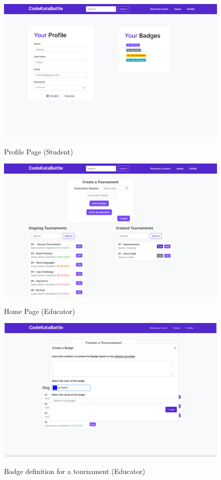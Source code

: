 \documentclass{Configuration_Files/Template}
\begin{document}
\begin{figure}[H]
\centering
\includegraphics[scale = 0.25]{Images/UI/Profile_Student.png}\\
\caption{Profile Page (Student) }
\end{figure}

\begin{figure}[H]
\centering
\includegraphics[scale = 0.25]{Images/UI/MainPageEducator.png}\\
\caption{Home Page (Educator)}
\end{figure}

\begin{figure}[H]
\centering
\includegraphics[scale = 0.25]{Images/UI/MainPageEducator-1.png}\\
\caption{Badge definition for a tournament (Educator)}
\end{figure}
\end{document}
